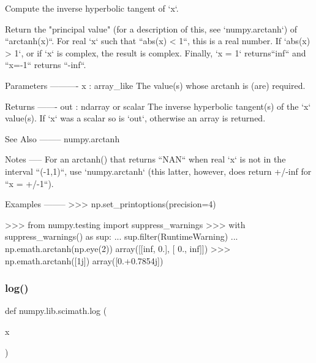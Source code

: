 \begin{DoxyVerb}Compute the inverse hyperbolic tangent of `x`.

Return the "principal value" (for a description of this, see
`numpy.arctanh`) of ``arctanh(x)``. For real `x` such that
``abs(x) < 1``, this is a real number.  If `abs(x) > 1`, or if `x` is
complex, the result is complex. Finally, `x = 1` returns``inf`` and
``x=-1`` returns ``-inf``.

Parameters
----------
x : array_like
   The value(s) whose arctanh is (are) required.

Returns
-------
out : ndarray or scalar
   The inverse hyperbolic tangent(s) of the `x` value(s). If `x` was
   a scalar so is `out`, otherwise an array is returned.


See Also
--------
numpy.arctanh

Notes
-----
For an arctanh() that returns ``NAN`` when real `x` is not in the
interval ``(-1,1)``, use `numpy.arctanh` (this latter, however, does
return +/-inf for ``x = +/-1``).

Examples
--------
>>> np.set_printoptions(precision=4)

>>> from numpy.testing import suppress_warnings
>>> with suppress_warnings() as sup:
...     sup.filter(RuntimeWarning)
...     np.emath.arctanh(np.eye(2))
array([[inf,  0.],
       [ 0., inf]])
>>> np.emath.arctanh([1j])
array([0.+0.7854j])\end{DoxyVerb}
 \mbox{\label{namespacenumpy_1_1lib_1_1scimath_a7219fe7d43e8f38dc344562ec9586219}} 
\subsubsection{\texorpdfstring{log()}{log()}}
{\footnotesize\ttfamily def numpy.\+lib.\+scimath.\+log (\begin{DoxyParamCaption}\item[{}]{x }\end{DoxyParamCaption})}

